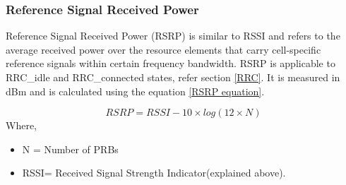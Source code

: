 \documentclass[12pt]{article}
\begin{document}
\begin{table}[H]
\caption {RSSI reference values for Sigfox \cite{sigfoxRSSI}}
\centering
{}
\label{sigfoxRSSI}
\end{table}


\subsubsection{Reference Signal Received Power}
Reference Signal Received Power (RSRP) is similar to RSSI and refers to the average received power over the resource elements that carry cell-specific reference signals within  certain  frequency  bandwidth. RSRP is applicable to RRC\_idle and RRC\_connected states, refer section \ref{RRC}. It is measured in dBm and is calculated using the equation \ref{RSRP equation}.

\begin{equation}
    RSRP = {{RSSI - 10\times log (12\times N) }}
    \label{RSRP equation}
\end{equation}
Where, 
\begin{itemize}
    \item N = Number of PRBs 
    \item RSSI= Received Signal Strength Indicator(explained above).
\end{itemize}
\end{document}
